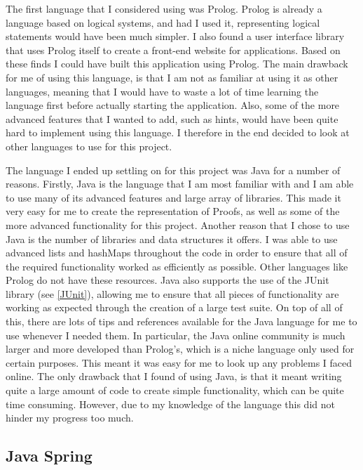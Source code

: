 The first language that I considered using was Prolog. Prolog is already a language based on logical systems, and had I used it, representing logical statements would have been much simpler. I also found a user interface library that uses Prolog itself to create a front-end website for applications. Based on these finds I could have built this application using Prolog. The main drawback for me of using this language, is that I am not as familiar at using it as other languages, meaning that I would have to waste a lot of time learning the language first before actually starting the application. Also, some of the more advanced features that I wanted to add, such as hints, would have been quite hard to implement using this language. I therefore in the end decided to look at other languages to use for this project. 

The language I ended up settling on for this project was Java for a number of reasons. Firstly, Java is the language that I am most familiar with and I am able to use many of its advanced features and large array of libraries. This made it very easy for me to create the representation of Proofs, as well as some of the more advanced functionality for this project. Another reason that I chose to use Java is the number of libraries and data structures it offers. I was able to use advanced lists and hashMaps throughout the code in order to ensure that all of the required functionality worked as efficiently as possible. Other languages like Prolog do not have these resources. Java also supports the use of the JUnit library (see \ref{JUnit}), allowing me to ensure that all pieces of functionality are working as expected through the creation of a large test suite. On top of all of this, there are lots of tips and references available for the Java language for me to use whenever I needed them. In particular, the Java online community is much larger and more developed than Prolog's, which is a niche language only used for certain purposes. This meant it was easy for me to look up any problems I faced online. The only drawback that I found of using Java, is that it meant writing quite a large amount of code to create simple functionality, which can be quite time consuming. However, due to my knowledge of the language this did not hinder my progress too much. 


\subsection{Java Spring \label{JavaSpring}}

